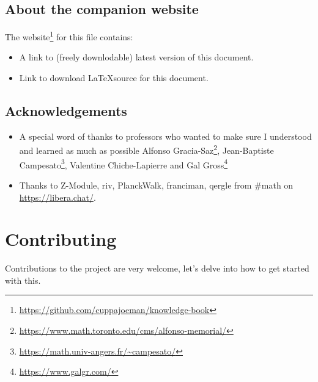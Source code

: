 \section*{About the companion website}
The website\footnote{\url{https://github.com/cuppajoeman/knowledge-book}} for this file contains:
\begin{itemize}
  \item A link to (freely downlodable) latest version of this document.
  \item Link to download \LaTeX source for this document.
\end{itemize}

\section*{Acknowledgements}
\begin{itemize}
    \item A special word of thanks to professors who wanted to make sure I understood and learned as much as possible Alfonso Gracia-Saz\footnote{\url{https://www.math.toronto.edu/cms/alfonso-memorial/}}, Jean-Baptiste Campesato\footnote{\url{https://math.univ-angers.fr/~campesato/}}, Valentine Chiche-Lapierre and Gal Gross\footnote{\url{https://www.galgr.com/}}
    \item Thanks to Z-Module, riv, PlanckWalk, franciman, qergle from \#math on \url{https://libera.chat/}.
\end{itemize}

\chapter*{Contributing}
 
Contributions to the project are very welcome, let's delve into how to get started with this.

